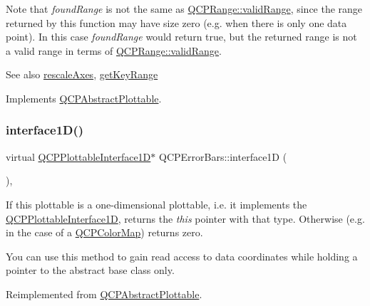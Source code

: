 Note that {\itshape found\+Range} is not the same as \hyperlink{class_q_c_p_range_ab38bd4841c77c7bb86c9eea0f142dcc0}{Q\+C\+P\+Range\+::valid\+Range}, since the range returned by this function may have size zero (e.\+g. when there is only one data point). In this case {\itshape found\+Range} would return true, but the returned range is not a valid range in terms of \hyperlink{class_q_c_p_range_ab38bd4841c77c7bb86c9eea0f142dcc0}{Q\+C\+P\+Range\+::valid\+Range}.

\begin{DoxySeeAlso}{See also}
\hyperlink{class_q_c_p_abstract_plottable_a1491c4a606bccd2d09e65e11b79eb882}{rescale\+Axes}, \hyperlink{class_q_c_p_error_bars_a6cac828a430d66ac77a167549d01d212}{get\+Key\+Range} 
\end{DoxySeeAlso}


Implements \hyperlink{class_q_c_p_abstract_plottable_a4de773988b21ed090fddd27c6a3a3dcb}{Q\+C\+P\+Abstract\+Plottable}.

\mbox{\label{class_q_c_p_error_bars_a0b6fbf3a943b4241ee485d066cc8562a}} 
\subsubsection{\texorpdfstring{interface1\+D()}{interface1D()}\hspace{0.1cm}{\footnotesize\ttfamily [1/2]}}
{\footnotesize\ttfamily virtual \hyperlink{class_q_c_p_plottable_interface1_d}{Q\+C\+P\+Plottable\+Interface1D}$\ast$ Q\+C\+P\+Error\+Bars\+::interface1D (\begin{DoxyParamCaption}{ }\end{DoxyParamCaption})\hspace{0.3cm}{\ttfamily [inline]}, {\ttfamily [virtual]}}

If this plottable is a one-\/dimensional plottable, i.\+e. it implements the \hyperlink{class_q_c_p_plottable_interface1_d}{Q\+C\+P\+Plottable\+Interface1D}, returns the {\itshape this} pointer with that type. Otherwise (e.\+g. in the case of a \hyperlink{class_q_c_p_color_map}{Q\+C\+P\+Color\+Map}) returns zero.

You can use this method to gain read access to data coordinates while holding a pointer to the abstract base class only. 

Reimplemented from \hyperlink{class_q_c_p_abstract_plottable_a81fd9fd5c4f429c074785e2eb238a8e7}{Q\+C\+P\+Abstract\+Plottable}.

